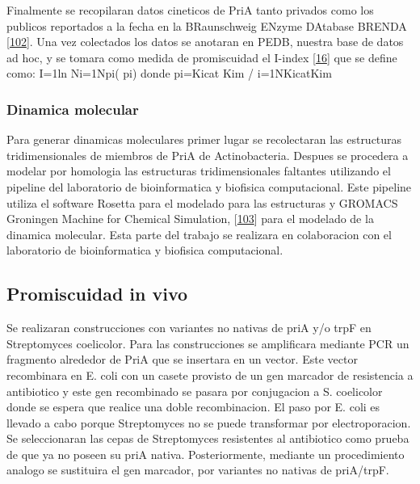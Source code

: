 \documentclass[12pt,twoside]{reedthesis}
\begin{document}
  Finalmente se recopilaran datos cineticos de PriA tanto privados como
  los publicos reportados a la fecha en la BRaunschweig ENzyme DAtabase
  BRENDA {[}\protect\hyperlink{ref-scheer_brenda_2011}{102}{]}. Una vez
  colectados los datos se anotaran en PEDB, nuestra base de datos ad hoc,
  y se tomara como medida de promiscuidad el I-index
  {[}\protect\hyperlink{ref-nath_quantitative_2008}{16}{]} que se define
  como: I=1ln Ni=1Npi( pi) donde pi=Kicat Kim / i=1NKicatKim
  
  \subsubsection{Dinamica molecular}\label{dinamica-molecular}
  
  Para generar dinamicas moleculares primer lugar se recolectaran las
  estructuras tridimensionales de miembros de PriA de Actinobacteria.
  Despues se procedera a modelar por homologia las estructuras
  tridimensionales faltantes utilizando el pipeline del laboratorio de
  bioinformatica y biofisica computacional. Este pipeline utiliza el
  software Rosetta para el modelado para las estructuras y GROMACS
  Groningen Machine for Chemical Simulation,
  {[}\protect\hyperlink{ref-van_der_spoel_gromacs_2005}{103}{]} para el
  modelado de la dinamica molecular. Esta parte del trabajo se realizara
  en colaboracion con el laboratorio de bioinformatica y biofisica
  computacional.
  
  \subsection{Promiscuidad in vivo}\label{promiscuidad-in-vivo}
  
  Se realizaran construcciones con variantes no nativas de priA y/o trpF
  en Streptomyces coelicolor. Para las construcciones se amplificara
  mediante PCR un fragmento alrededor de PriA que se insertara en un
  vector. Este vector recombinara en E. coli con un casete provisto de un
  gen marcador de resistencia a antibiotico y este gen recombinado se
  pasara por conjugacion a S. coelicolor donde se espera que realice una
  doble recombinacion. El paso por E. coli es llevado a cabo porque
  Streptomyces no se puede transformar por electroporacion. Se
  seleccionaran las cepas de Streptomyces resistentes al antibiotico como
  prueba de que ya no poseen su priA nativa. Posteriormente, mediante un
  procedimiento analogo se sustituira el gen marcador, por variantes no
  nativas de priA/trpF.
  
\end{document}
